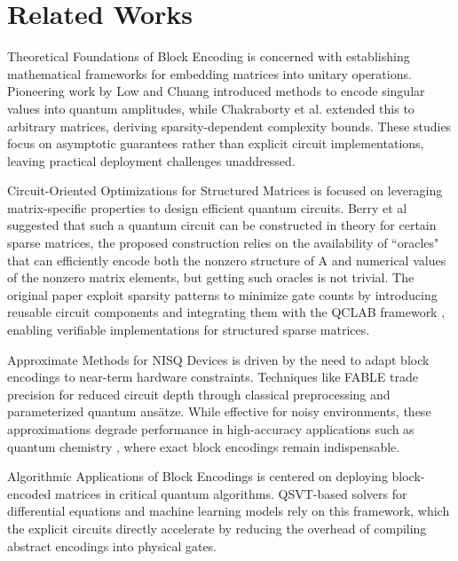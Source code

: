 \documentclass{article}
\begin{document}
    \section{Related Works}


    \label{sec:related_works}

    Theoretical Foundations of Block Encoding is concerned with establishing mathematical frameworks for embedding matrices into unitary operations. Pioneering work by Low and Chuang\cite{low2017optimal}
    introduced methods to encode singular values into quantum amplitudes, while Chakraborty et al.\cite{chakraborty2018power}
    extended this to arbitrary matrices, deriving sparsity-dependent complexity bounds. These studies focus on asymptotic guarantees rather than explicit circuit implementations, leaving practical deployment challenges unaddressed.

    Circuit-Oriented Optimizations for Structured Matrices is focused on leveraging matrix-specific properties to design efficient quantum circuits.
    Berry et al \cite{berry2015hamiltonian} suggested that such a quantum circuit can
    be constructed in theory for certain sparse matrices, the proposed construction relies on the availability of “oracles" that
    can efficiently encode both the nonzero structure of A and numerical values of the nonzero matrix elements, but getting such oracles is not trivial.
    The original paper exploit sparsity patterns to minimize gate counts by introducing reusable circuit components and integrating them with the QCLAB framework
    , enabling verifiable implementations for structured sparse matrices.

    Approximate Methods for NISQ Devices is driven by the need to adapt block encodings to near-term hardware constraints. Techniques like FABLE \cite{camps2022fable}
    trade precision for reduced circuit depth through classical preprocessing and parameterized quantum ansätze. While effective for noisy environments, these approximations degrade performance in high-accuracy applications such as quantum chemistry
    , where exact block encodings remain indispensable.

    Algorithmic Applications of Block Encodings is centered on deploying block-encoded matrices in critical quantum algorithms. QSVT-based solvers \cite{Gilyen2019}for differential equations
    and machine learning models rely on this framework, which the explicit circuits directly accelerate by reducing the overhead of compiling abstract encodings into physical gates.
\end{document}
